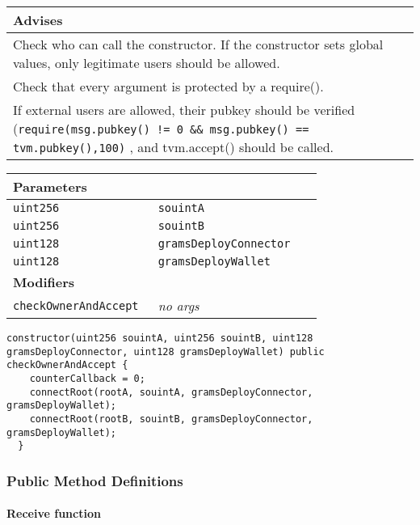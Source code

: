 \ifsoldraft
\noindent\begin{tabular}{|p{12cm}|}\hline
\rowcolor{green}Advises
\\\hline
Check who can call the constructor. If the constructor sets global values, only legitimate users should be allowed.
\\\hline
Check that every argument is protected by a require().
\\\hline
If external users are allowed, their pubkey should be verified (\verb+require(msg.pubkey() != 0 && msg.pubkey() == tvm.pubkey(),100)+ , and tvm.accept() should be called.
\\\hline\end{tabular}
\fi

\ifsoltables
\noindent\begin{tabular}{|l|l|p{5cm}|}\hline
\multicolumn{3}{|l|}{\bf Parameters}\\\hline
\tt uint256 & \tt souintA &\\\hline
\tt uint256 & \tt souintB &\\\hline
\tt uint128 & \tt gramsDeployConnector &\\\hline
\tt uint128 & \tt gramsDeployWallet &\\\hline
\multicolumn{3}{|l|}{\bf Modifiers}\\\hline
\tt checkOwnerAndAccept & {\em no args} &\\\hline
\end{tabular}
\fi

\vspace{2cm}

\begin{lstlisting}[firstnumber=88]
  constructor(uint256 souintA, uint256 souintB, uint128 gramsDeployConnector, uint128 gramsDeployWallet) public checkOwnerAndAccept {
    counterCallback = 0;
    connectRoot(rootA, souintA, gramsDeployConnector, gramsDeployWallet);
    connectRoot(rootB, souintB, gramsDeployConnector, gramsDeployWallet);
  }
\end{lstlisting}

\subsubsection{Public Method Definitions}


\paragraph{Receive function}

\vspace{2cm}

